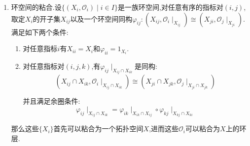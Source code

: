 \begin{enumerate}
\begin{enumerate}[(1)]
	\end{enumerate}
	\item 环空间的粘合.设$\{(X_i,\mathscr{O}_i)\mid i\in I\}$是一族环空间,对任意有序的指标对$(i,j)$,取定$X_i$的开子集$X_{ij}$以及一个环空间同构$\varphi_{ij}:(X_{ij},\mathscr{O}_i\mid_{X_{ij}})\cong(X_{ji},\mathscr{O}_j\mid_{X_{ji}})$.满足如下两个条件:
	\begin{enumerate}[(1)]
		\item 对任意指标$i$有$X_{ii}=X_i$和$\varphi_{ii}=1_{X_i}$.
		\item 对任意指标对$(i,j,k)$,有$\varphi_{ij}\mid_{X_{ij}\cap X_{ik}}$是同构:
		$$(X_{ij}\cap X_{ik},\mathscr{O}_i\mid_{X_{ij}\cap X_{ik}})\cong(X_{ji}\cap X_{jk},\mathscr{O}_j\mid_{X_{ji}\cap X_{jk}})$$
		
		并且满足余圈条件:
		$$\varphi_{ij}\mid_{X_{ij}\cap X_{ik}}=\varphi_{ik}\mid_{X_{ik}\cap X_{ij}}\circ\varphi_{kj}\mid_{X_{kj}\cap X_{ki}}$$
	\end{enumerate}
	
	那么这些$\{X_i\}$首先可以粘合为一个拓扑空间$X$,进而这些$\mathscr{O}_i$可以粘合为$X$上的环层.
\end{enumerate}
